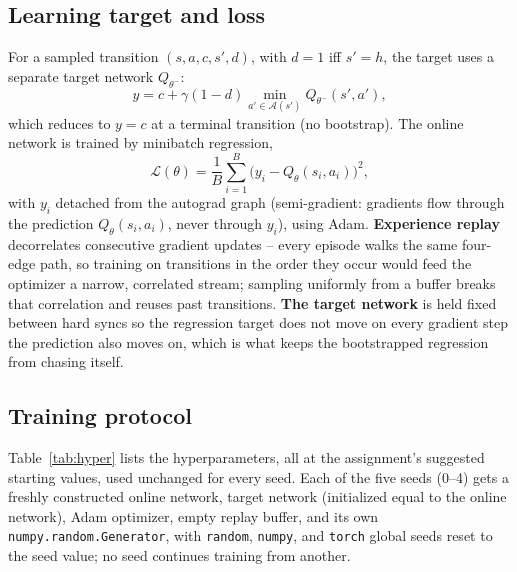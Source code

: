 \documentclass[conference]{IEEEtran}
\begin{document}
\subsection{Learning target and loss}
For a sampled transition $(s,a,c,s',d)$, with $d{=}1$ iff $s'{=}h$, the
target uses a separate target network $Q_{\theta^-}$:
\begin{equation}
y = c + \gamma(1-d)\min_{a'\in\mathcal{A}(s')} Q_{\theta^-}(s',a'),
\end{equation}
which reduces to $y=c$ at a terminal transition (no bootstrap). The online
network is trained by minibatch regression,
\begin{equation}
\mathcal{L}(\theta) = \frac{1}{B}\sum_{i=1}^{B}\big(y_i - Q_\theta(s_i,a_i)\big)^2,
\end{equation}
with $y_i$ detached from the autograd graph (semi-gradient: gradients flow
through the prediction $Q_\theta(s_i,a_i)$, never through $y_i$), using
Adam. \textbf{Experience replay} decorrelates consecutive gradient updates
-- every episode walks the same four-edge path, so training on transitions
in the order they occur would feed the optimizer a narrow, correlated
stream; sampling uniformly from a buffer breaks that correlation and reuses
past transitions. \textbf{The target network} is held fixed between hard
syncs so the regression target does not move on every gradient step the
prediction also moves on, which is what keeps the bootstrapped regression
from chasing itself.

\subsection{Training protocol}
Table~\ref{tab:hyper} lists the hyperparameters, all at the assignment's
suggested starting values, used unchanged for every seed. Each of the five
seeds (0--4) gets a freshly constructed online network, target network
(initialized equal to the online network), Adam optimizer, empty replay
buffer, and its own \texttt{numpy.random.Generator}, with
\texttt{random}, \texttt{numpy}, and \texttt{torch} global seeds reset to
the seed value; no seed continues training from another.
\end{document}
